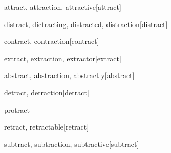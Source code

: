 \begin{wordRef}{attract, attraction, attractive}[attract]
\end{wordRef}

\begin{wordRef}{distract, dictracting, distracted, distraction}[distract]
\end{wordRef}

\begin{wordRef}{contract, contraction}[contract]
\end{wordRef}

\begin{wordRef}{extract, extraction, extractor}[extract]
\end{wordRef}

\begin{wordRef}{abstract, abstraction, abstractly}[abstract]
\end{wordRef}

\begin{wordRef}{detract, detraction}[detract]
\end{wordRef}

\begin{wordRef}{protract} 
\end{wordRef}

\begin{wordRef}{retract, retractable}[retract]
\end{wordRef}

\begin{wordRef}{subtract, subtraction, subtractive}[subtract]
\end{wordRef}